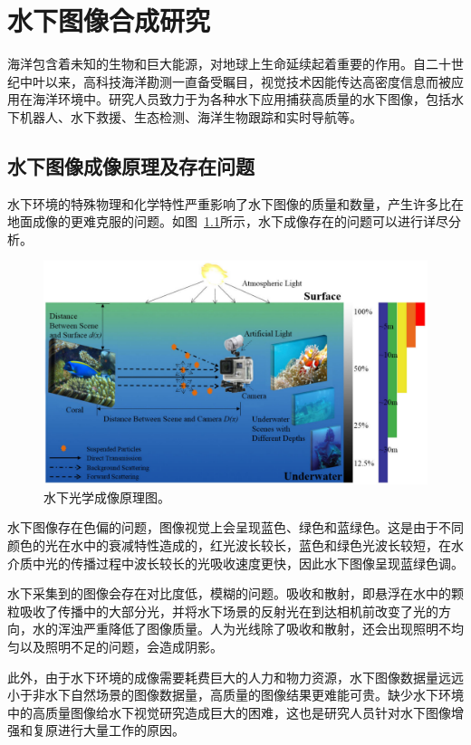 \chapter{水下图像合成研究}
海洋包含着未知的生物和巨大能源，对地球上生命延续起着重要的作用。自二十世纪中叶以来，高科技海洋勘测一直备受瞩目，视觉技术因能传达高密度信息而被应用在海洋环境中。研究人员致力于为各种水下应用捕获高质量的水下图像，包括水下机器人、水下救援、生态检测、海洋生物跟踪和实时导航等。

\section{水下图像成像原理及存在问题}
水下环境的特殊物理和化学特性严重影响了水下图像的质量和数量，产生许多比在地面成像的更难克服的问题。如图~\ref{fig:underwater}所示，水下成像存在的问题可以进行详尽分析。

\begin{figure}[ht]
    \centering
	\includegraphics[width=\textwidth]{figs/水下成像.pdf}
	\caption{水下光学成像原理图。}
	\label{fig:underwater}
\end{figure}

水下图像存在色偏的问题，图像视觉上会呈现蓝色、绿色和蓝绿色。这是由于不同颜色的光在水中的衰减特性造成的，红光波长较长，蓝色和绿色光波长较短，在水介质中光的传播过程中波长较长的光吸收速度更快，因此水下图像呈现蓝绿色调。

水下采集到的图像会存在对比度低，模糊的问题。吸收和散射，即悬浮在水中的颗粒吸收了传播中的大部分光，并将水下场景的反射光在到达相机前改变了光的方向，水的浑浊严重降低了图像质量。人为光线除了吸收和散射，还会出现照明不均匀以及照明不足的问题，会造成阴影。

此外，由于水下环境的成像需要耗费巨大的人力和物力资源，水下图像数据量远远小于非水下自然场景的图像数据量，高质量的图像结果更难能可贵。缺少水下环境中的高质量图像给水下视觉研究造成巨大的困难，这也是研究人员针对水下图像增强和复原进行大量工作的原因。

